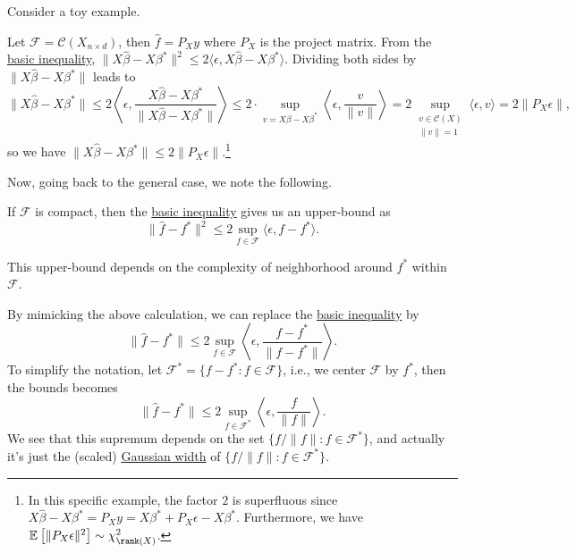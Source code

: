 Consider a toy example.

\begin{eg}
	Let \(\mathscr{F} = \mathcal{C} (X_{n\times d})\), then \(\hat{f} = P_X y\) where \(P_X\) is the project matrix. From the \hyperref[eq:basic-inequality]{basic inequality}, \(\lVert X \hat{\beta} - X \beta ^{\ast}  \rVert ^2 \leq 2 \langle \epsilon , X \hat{\beta} - X \beta ^{\ast} \rangle\). Dividing both sides by \(\lVert X \hat{\beta} - X \beta ^{\ast} \rVert \) leads to
	\[
		\lVert X \hat{\beta} - X \beta ^{\ast} \rVert \leq 2 \left\langle \epsilon , \frac{X \hat{\beta} - X \beta ^{\ast}}{\lVert X \hat{\beta} - X \beta ^{\ast} \rVert } \right\rangle
		\leq 2\cdot \sup _{v = X \beta - X \beta ^{\ast} } \left\langle \epsilon , \frac{v}{\lVert v \rVert } \right\rangle
		= 2 \sup _{\substack{v\in \mathcal{C} (X) \\ \lVert v \rVert = 1}} \langle \epsilon , v \rangle
		= 2 \lVert P_X \epsilon  \rVert,
	\]
	so we have \(\lVert X \hat{\beta} - X \beta ^{\ast} \rVert \leq 2 \lVert P_X \epsilon \rVert \).\footnote{In this specific example, the factor \(2\) is superfluous since \(X \hat{\beta} - X \beta ^{\ast} = P_X y = X \beta ^{\ast} + P_X \epsilon - X \beta ^{\ast} \). Furthermore, we have \(\mathbb{E}_{}\left[ \lVert P_X \epsilon \rVert ^2 \right] \sim \chi ^2_{\rank (X)}\).}
\end{eg}

Now, going back to the general case, we note the following.

\begin{note}
	If \(\mathscr{F} \) is compact, then the \hyperref[eq:basic-inequality]{basic inequality} gives us an upper-bound as
	\[
		\lVert \hat{f} - f^{\ast} \rVert ^2 \leq 2 \sup _{f\in \mathscr{F} } \langle \epsilon , f - f^{\ast} \rangle.
	\]
\end{note}

\begin{intuition}
	This upper-bound depends on the complexity of neighborhood around \(f^{\ast} \) within \(\mathscr{F} \).
\end{intuition}

By mimicking the above calculation, we can replace the \hyperref[eq:basic-inequality]{basic inequality} by
\[
	\lVert \hat{f} - f^{\ast} \rVert \leq 2 \sup _{f\in \mathscr{F} } \left\langle \epsilon , \frac{f - f^{\ast} }{\lVert f - f^{\ast} \rVert } \right\rangle .
\]
To simplify the notation, let \(\mathscr{F} ^{\ast} = \{ f - f^{\ast} \colon f \in \mathscr{F} \} \), i.e., we center \(\mathscr{F} \) by \(f^{\ast} \), then the bounds becomes
\[
	\lVert \hat{f} - f^{\ast} \rVert \leq 2 \sup _{f\in \mathscr{F} ^{\ast} } \left\langle \epsilon , \frac{f}{\lVert f \rVert } \right\rangle .
\]
We see that this supremum depends on the set \(\{ f / \lVert f \rVert \colon f\in \mathscr{F} ^{\ast} \} \), and actually it's just the (scaled) \hyperref[def:Gaussian-width]{Gaussian width} of \(\{ f / \lVert f \rVert \colon f\in \mathscr{F} ^{\ast} \}\).

